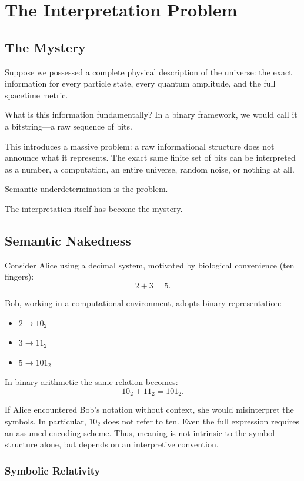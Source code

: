 \chapter{The Interpretation Problem}
\label{chap:interpretation-problem}

\section{The Mystery}

Suppose we possessed a complete physical description of the universe: the exact information for every particle state, every quantum amplitude, and the full spacetime metric.

What is this information fundamentally? In a binary framework, we would call it a bitstring—a raw sequence of bits.

This introduces a massive problem: a raw informational structure does not announce what it represents.
The exact same finite set of bits can be interpreted as a number, a computation, an entire universe, random noise, or nothing at all.

Semantic underdetermination is the problem.

The interpretation itself has become the mystery.


\section{Semantic Nakedness}

Consider Alice using a decimal system, motivated by biological convenience (ten fingers):
\[
2 + 3 = 5.
\]

Bob, working in a computational environment, adopts binary representation:
\begin{itemize}
\item $2 \rightarrow 10_2$
\item $3 \rightarrow 11_2$
\item $5 \rightarrow 101_2$
\end{itemize}

In binary arithmetic the same relation becomes:
\[
10_2 + 11_2 = 101_2.
\]

If Alice encountered Bob's notation without context, she would misinterpret the symbols.
In particular, $10_2$ does not refer to ten.
Even the full expression requires an assumed encoding scheme.
Thus, meaning is not intrinsic to the symbol structure alone, but depends on an interpretive convention.

\subsection*{Symbolic Relativity}

